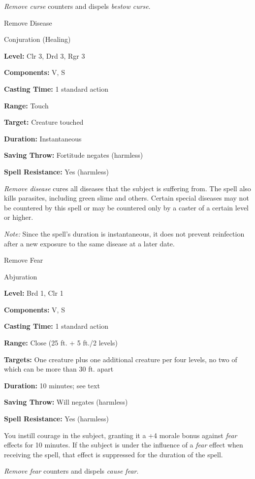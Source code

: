 \documentclass{article}
\begin{document}
\textit{Remove curse }counters and dispels \textit{bestow curse}.

\vspace{12pt}
Remove Disease

Conjuration (Healing)

\textbf{Level:} Clr 3, Drd 3, Rgr 3

\textbf{Components:} V, S

\textbf{Casting Time:} 1 standard action

\textbf{Range:} Touch

\textbf{Target:} Creature touched

\textbf{Duration:} Instantaneous

\textbf{Saving Throw:} Fortitude negates (harmless)

\textbf{Spell Resistance:} Yes (harmless)

\textit{Remove disease }cures all diseases that the subject is suffering from. 
The spell also kills parasites, including green slime and others. Certain special 
diseases may not be countered by this spell or may be countered only by a caster 
of a certain level or higher.

\textit{Note: }Since the spell's duration is instantaneous, it does not prevent 
reinfection after a new exposure to the same disease at a later date.

\vspace{12pt}
Remove Fear

Abjuration

\textbf{Level:} Brd 1, Clr 1

\textbf{Components:} V, S

\textbf{Casting Time:} 1 standard action

\textbf{Range:} Close (25 ft. + 5 ft./2 levels)

\textbf{Targets:} One creature plus one additional creature per four levels, no 
two of which can be more than 30 ft. apart

\textbf{Duration:} 10 minutes; see text

\textbf{Saving Throw: }Will negates (harmless)

\textbf{Spell Resistance:} Yes (harmless)

You instill courage in the subject, granting it a +4 morale bonus against \textit{fear 
}effects for 10 minutes. If the subject is under the influence of a \textit{fear 
}effect when receiving the spell, that effect is suppressed for the duration of 
the spell.

\textit{Remove fear }counters and dispels \textit{cause fear}.
\end{document}
